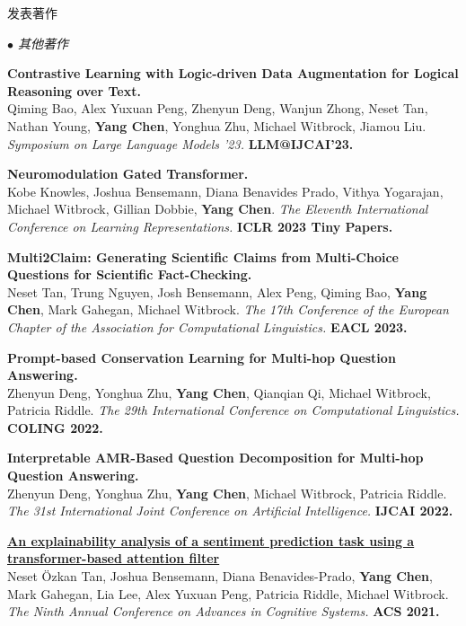 \documentclass{resume} %
\begin{document}
\begin{rSection}{发表著作}
\begin{rSubsection}{\large\em $\bullet$ 其他著作}{}{}{}
\item {\bf Contrastive Learning with Logic-driven Data Augmentation for Logical Reasoning over Text.}\\
Qiming Bao, Alex Yuxuan Peng, Zhenyun Deng, Wanjun Zhong, Neset Tan, Nathan Young, \textbf{Yang Chen}, Yonghua Zhu, Michael Witbrock, Jiamou Liu. {\em Symposium on Large Language Models \@IJCAI'23.} {\bf LLM@IJCAI'23.}\\
\item {\bf Neuromodulation Gated Transformer.}\\
Kobe Knowles, Joshua Bensemann, Diana Benavides Prado, Vithya Yogarajan, Michael Witbrock, Gillian Dobbie, \textbf{Yang Chen}. {\em The Eleventh International Conference on Learning Representations.} {\bf ICLR 2023 Tiny Papers.}\\
\item {\bf Multi2Claim: Generating Scientific Claims from Multi-Choice Questions for Scientific Fact-Checking.}\\
Neset Tan, Trung Nguyen, Josh Bensemann, Alex Peng, Qiming Bao, \textbf{Yang Chen}, Mark Gahegan, Michael Witbrock. {\em The 17th Conference of the European Chapter of the Association for Computational Linguistics.} {\bf EACL 2023.}\\
\item {\bf Prompt-based Conservation  Learning for Multi-hop Question Answering.}\\
Zhenyun Deng, Yonghua Zhu, \textbf{Yang Chen}, Qianqian Qi, Michael Witbrock, Patricia Riddle. {\em The 29th International Conference on Computational Linguistics.} \textbf{COLING 2022.}\\
\item {\bf Interpretable AMR-Based Question Decomposition for Multi-hop Question Answering.}\\
		Zhenyun Deng, Yonghua Zhu, \textbf{Yang Chen}, Michael Witbrock, Patricia Riddle. {\em The 31st International Joint Conference on Artificial Intelligence.} \textbf{IJCAI 2022.}\\
\item {\href{https://advancesincognitivesystems.github.io/acs2021/data/ACS-21_paper_22.pdf}{\bf An explainability analysis of a sentiment prediction task using a transformer-based attention filter}}\\
		Neset \"{O}zkan Tan, Joshua Bensemann, Diana Benavides-Prado, \textbf{Yang Chen}, Mark Gahegan, Lia Lee, Alex Yuxuan Peng, Patricia Riddle, Michael Witbrock. {\em The Ninth Annual Conference on Advances in Cognitive Systems.} \textbf{ACS 2021.}\\


\end{rSubsection}
\end{rSection}
\end{document}
